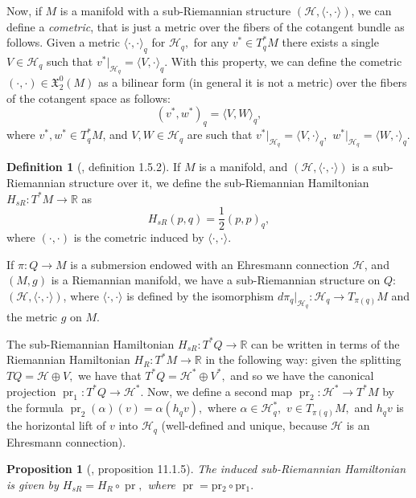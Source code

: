 \documentclass[12pt, letterpaper, reqno]{amsart}
\theoremstyle{definition}
\newtheorem{df}{Definition}
\theoremstyle{plain}
\newtheorem{prop}{Proposition}
\theoremstyle{remark}
\begin{document}
Now, if $ M $ is a manifold with a sub-Riemannian structure $ \left( \mathcal{H}, \langle \cdot,\cdot \rangle \right)  $, we can define a \textit{cometric}, that is just a metric over the fibers of the cotangent bundle as follows. Given a metric $ \langle \cdot,\cdot \rangle_q $ for $ \mathcal{H}_q, $ for any $ v^*\in T^*_qM $ there exists a single $ V\in \mathcal{H}_q $ such that $ v^*|_{\mathcal{H}_q} = \langle V,\cdot \rangle_q $. With this property, we can define the cometric $ (\cdot,\cdot)\in \mathfrak{X}_2^0(M) $ as a bilinear form (in general it is not a metric) over the fibers of the cotangent space as follows:
$$ (v^*,w^*)_q= \langle V,W \rangle_q, $$ 
where $ v^*,w^*\in T^*_qM $, and $ V,W\in \mathcal{H}_q $ are such that $ v^*|_{\mathcal{H}_q}= \langle V,\cdot \rangle_q, $ $ w^*|_{\mathcal{H}_q}= \langle W,\cdot \rangle_q. $ 
\begin{df}[\cite{montgomery2002tour}, definition 1.5.2]
	If $ M $ is a manifold, and $ \left( \mathcal{H}, \langle\cdot,\cdot\rangle \right) $ is a sub-Riemannian structure over it, we define the sub-Riemannian Hamiltonian $ H_{sR}: T^*M \rightarrow \mathbb{R} $ as $$ H_{sR}(p,q)= \frac{1}{2} (p,p)_q, $$   	
	where $ (\cdot,\cdot) $ is the cometric induced by $ \langle\cdot,\cdot\rangle. $ 
\end{df}
If $ \pi: Q \rightarrow M $ is a submersion endowed with an Ehresmann connection $ \mathcal{H} $, and $ (M,g) $ is a Riemannian manifold, we have a sub-Riemannian structure on $ Q: $ $ (\mathcal{H},\langle\cdot,\cdot\rangle) $, where $ \langle\cdot,\cdot\rangle $ is defined by the isomorphism $ d\pi_q|_{\mathcal{H}_q}: \mathcal{H}_q \rightarrow T_{\pi(q)}M $ and the metric $ g $ on $ M. $ 

The sub-Riemannian Hamiltonian $ H_{sR}: T^*Q \rightarrow \mathbb{R}$ can be written in terms of the Riemannian Hamiltonian $ H_R: T^*M \rightarrow \mathbb{R} $ in the following way: given the splitting $ TQ= \mathcal{H}\oplus V, $ we have that $ T^*Q = \mathcal{H}^* \oplus V^*, $ and so we have the canonical projection $ \operatorname{pr}_1: T^*Q \rightarrow \mathcal{H}^*. $ Now, we define a second map $ \operatorname{pr}_2: \mathcal{H}^* \rightarrow T^*M $ by the formula $ \operatorname{pr}_2(\alpha)(v)=\alpha(h_q v), $ where $ \alpha\in \mathcal{H}^*_q, $ $ v\in T_{\pi(q)}M, $ and $h_qv$ is the horizontal lift of $ v $ into $ \mathcal{H}_q $ (well-defined and unique, because $ \mathcal{H} $ is an Ehresmann connection).
\begin{prop}[\cite{montgomery2002tour}, proposition 11.1.5]
	The induced sub-Riemannian Hamiltonian is given by $H_{sR}= H_R \circ \operatorname{pr},$ where $ \operatorname{pr}= \operatorname{pr_2}\circ \operatorname{pr_1}. $ 
\end{prop}
\end{document}
